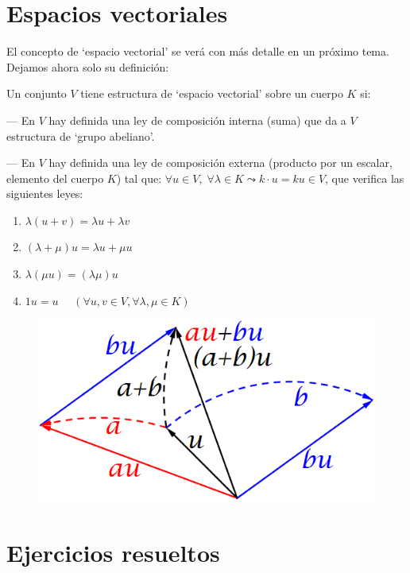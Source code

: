 \section{Espacios vectoriales}
El concepto de `espacio vectorial' se verá con más detalle en un próximo tema. Dejamos ahora solo su definición:
\begin{defi}
	Un conjunto $V$ tiene estructura de `espacio vectorial' sobre un cuerpo $K$ si:
	
	--- En $V$ hay definida una ley de composición interna (suma) que da a $V$ estructura de `grupo abeliano'.
	
	--- En $V$ hay definida una ley de composición externa (producto por un escalar, elemento del cuerpo $K$) tal que: $\forall u \in V ,\; \forall \lambda \in K \leadsto k\cdot u=ku \in V$, que verifica las siguientes leyes:
	
	\begin{multicols}{2}
	\begin{enumerate}
	\item $\lambda (u+v)=\lambda u + \lambda v$
	\item $(\lambda + \mu)u=\lambda u + \mu u$
	\item $\lambda(\mu u)=(\lambda \mu) u$
	\item $1u=u \quad$ \footnotesize{$( \forall u,v \in V, \forall \lambda, \mu \in K)$}	
	\end{enumerate}
	\end{multicols}	
\end{defi}


	\begin{figure}[H]
		\centering
		\includegraphics[width=.8\textwidth]{imagenes/imagenes01/T01IM01.png}
	\end{figure}


\section{Ejercicios resueltos}

